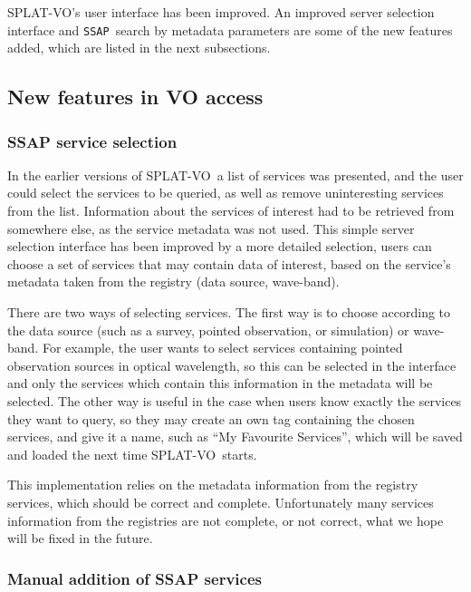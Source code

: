 \documentclass[final,authoryear,5p,times,twocolumn]{elsarticle}
\newcommand{\ssap}{\texttt{SSAP}}
\newcommand{\splatvo}{{\textsf{\small{SPLAT-VO}}}}
\begin{document}
\splatvo's user interface has been improved. An improved server
selection interface and \ssap\ search by metadata parameters are some of
the new features added, which are listed in the next subsections.

\subsection{New features in VO access}

\subsubsection{SSAP service selection}

In the earlier versions of \splatvo\ a list of services was presented, and
the user could select the services to be queried, as well as remove
uninteresting services from the list. Information about the services
of interest had to be retrieved from somewhere else, as the service
metadata was not used.  This simple server selection interface has
been improved by a more detailed selection, users can choose a set of
services that may contain data of interest, based on the service's
metadata taken from the registry (data source, wave-band).

There are two ways of selecting services. The first way is to choose
according to the data source (such as a survey, pointed observation, or simulation)
or wave-band.  For example, the user wants to select services
containing pointed observation sources in optical wavelength, so this
can be selected in the interface and only the services which contain
this information in the metadata will be selected.  The other way is
useful in the case when users know exactly the services they want to
query, so they may create an own tag containing the chosen services,
and give it a name, such as ``My Favourite Services'', which will be saved
and loaded the next time \splatvo\ starts.

This implementation relies on the metadata information from the
registry services, which should be correct and complete. Unfortunately
many services information from the registries are not complete, or not
correct, what we hope will be fixed in the future.



\subsubsection{Manual addition of SSAP services}
\end{document}
